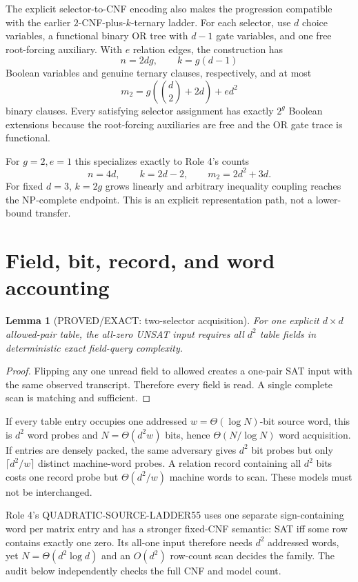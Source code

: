\documentclass[11pt]{article}
\newtheorem{lemma}{Lemma}
\begin{document}
The explicit selector-to-CNF encoding also makes the progression compatible
with the earlier $2$-CNF-plus-$k$-ternary ladder. For each selector, use $d$
choice variables, a functional binary OR tree with $d-1$ gate variables,
and one free root-forcing auxiliary. With $e$ relation edges, the construction
has
\[
n=2dg,\qquad k=g(d-1)
\]
Boolean variables and genuine ternary clauses, respectively, and at most
\[
m_2=
g\left(\binom d2+2d\right)+ed^2
\]
binary clauses. Every satisfying selector assignment has exactly $2^g$
Boolean extensions because the root-forcing auxiliaries are free and the OR
gate trace is functional.

For $g=2,e=1$ this specializes exactly to Role 4's counts
\[
n=4d,\qquad k=2d-2,\qquad m_2=2d^2+3d.
\]
For fixed $d=3$, $k=2g$ grows linearly and arbitrary inequality coupling
reaches the NP-complete endpoint. This is an explicit representation path,
not a lower-bound transfer.

\section{Field, bit, record, and word accounting}
\begin{lemma}[PROVED/EXACT: two-selector acquisition]
For one explicit $d\times d$ allowed-pair table, the all-zero UNSAT input
requires all $d^2$ table fields in deterministic exact field-query
complexity.
\end{lemma}
\begin{proof}
Flipping any one unread field to allowed creates a one-pair SAT input with the
same observed transcript. Therefore every field is read. A single complete
scan is matching and sufficient.
\end{proof}

If every table entry occupies one addressed $w=\Theta(\log N)$-bit source
word, this is $d^2$ word probes and
$N=\Theta(d^2w)$ bits, hence $\Theta(N/\log N)$ word acquisition. If entries
are densely packed, the same adversary gives $d^2$ bit probes but only
$\lceil d^2/w\rceil$ distinct machine-word probes. A relation record
containing all $d^2$ bits costs one record probe but $\Theta(d^2/w)$ machine
words to scan. These models must not be interchanged.

Role 4's QUADRATIC-SOURCE-LADDER55 uses one separate sign-containing word per
matrix entry and has a stronger fixed-CNF semantic: SAT iff some row contains
exactly one zero. Its all-one input therefore needs $d^2$ addressed words,
yet $N=\Theta(d^2\log d)$ and an $O(d^2)$ row-count scan decides the family.
The audit below independently checks the full CNF and model count.
\end{document}
